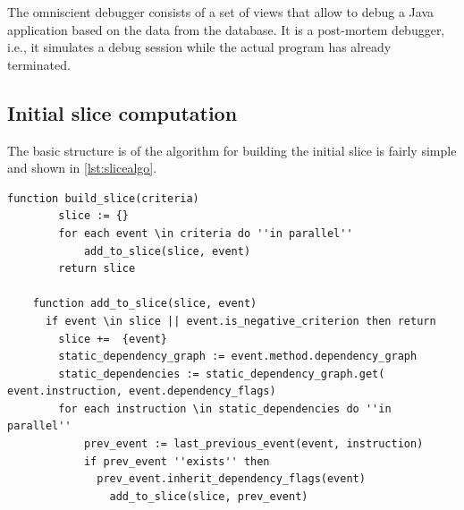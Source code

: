 ﻿\documentclass[
      english,
			conference,
      ]{IEEEtran}
\begin{document}
The omniscient debugger consists of a set of views that allow to debug a Java application based on the data from the database.
It is a post-mortem debugger, i.e., it simulates a debug session while the actual program has already terminated.

\subsection{Initial slice computation}

The basic structure is of the algorithm for building the initial slice is fairly simple and shown in \cref{lst:slicealgo}.

\begin{lstlisting}[float=t,language=algorithm,label=lst:slicealgo,caption={Simplified algorithm for building the slice}]
	function build_slice(criteria)
		slice := {}
		for each event \in criteria do ''in parallel''
			add_to_slice(slice, event)
		return slice
		
	function add_to_slice(slice, event)
	  if event \in slice || event.is_negative_criterion then return
		slice +=  {event}
		static_dependency_graph := event.method.dependency_graph
		static_dependencies := static_dependency_graph.get( event.instruction, event.dependency_flags)
		for each instruction \in static_dependencies do ''in parallel''
			prev_event := last_previous_event(event, instruction)
			if prev_event ''exists'' then
			  prev_event.inherit_dependency_flags(event)
				add_to_slice(slice, prev_event)
\end{lstlisting}


\end{document}
